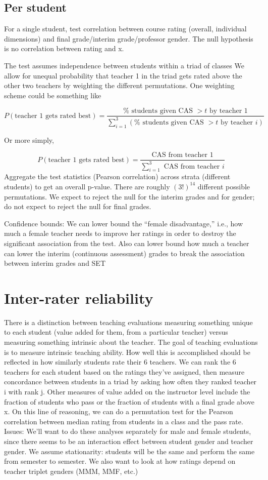 \documentclass[12pt]{article}
\begin{document}
\subsection{Per student}
For a single student, test correlation between course rating (overall, individual dimensions) and final grade/interim grade/professor gender.
The null hypothesis is no correlation between rating and x.

The test assumes independence between students within a triad of classes
 We allow for unequal probability that teacher 1 in the triad gets rated above the other two teachers by weighting the different permutations. One weighting scheme could be something like

$$P(\text{teacher 1 gets rated best}) = \frac{\%\text{ students given CAS }> t\text{ by teacher 1}}{\sum_{i=1}^3(\%\text{ students given CAS }> t\text{ by teacher }i)}$$
 
Or more simply, 

$$P(\text{teacher 1 gets rated best}) = \frac{\text{CAS from teacher 1}}{\sum_{i=1}^3\text{ CAS from teacher }i}$$
Aggregate the test statistics (Pearson correlation) across strata (different students) to get an overall p-value.  There are roughly $(3!)^{14}$ different possible permutations.
We expect to reject the null for the interim grades and for gender; do not expect to reject the null for final grades.
 
Confidence bounds:
We can lower bound the ``female disadvantage,'' i.e., 
how much a female teacher needs to improve her ratings in order to destroy the 
significant association from the test.
Also can lower bound how much a teacher can lower the interim (continuous assessment) grades to break the association between interim grades and SET

\section{Inter-rater reliability}
There is a distinction between teaching evaluations measuring something unique to each student 
(value added for them, from a particular teacher) versus 
measuring something intrinsic about the teacher.  
The goal of teaching evaluations is to measure intrinsic teaching ability.  
How well this is accomplished should be reflected in how similarly 
students rate their 6 teachers.
We can rank the 6 teachers for each student based on the ratings 
they've assigned, then measure concordance between students in a triad by asking how often they ranked teacher i with rank j.
Other measures of value added on the instructor level include the fraction of 
students who pass or the fraction of students with a final grade above x.  
On this line of reasoning, we can do a permutation test for the 
Pearson correlation between median rating from students in a class and the pass rate.
Issues:
We'll want to do these analyses separately for male and female students, 
since there seems to be an interaction effect between student gender and teacher gender.
We assume stationarity: students will be the same and perform the same from semester to semester.
We also want to look at how ratings depend on teacher triplet genders (MMM, MMF, etc.)
\end{document}
